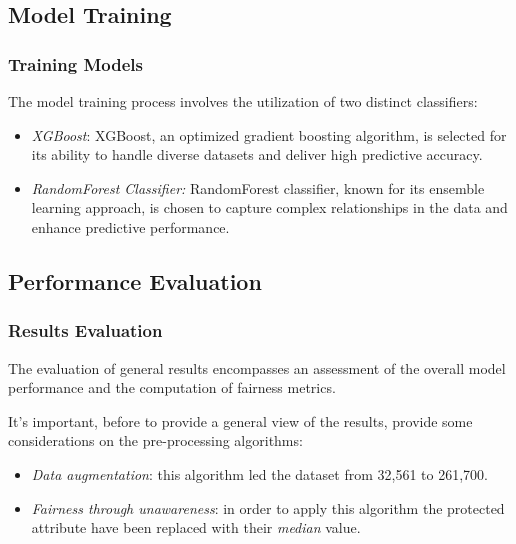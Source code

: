 \subsection{Model Training}

\subsubsection{Training Models}

The model training process involves the utilization of two distinct classifiers:

\begin{itemize}

    \item \emph{XGBoost}: XGBoost, an optimized gradient boosting algorithm, is selected for its ability to handle diverse datasets and deliver high predictive accuracy.

    \item \emph{RandomForest Classifier:} RandomForest classifier, known for its ensemble learning approach, is chosen to capture complex relationships in the data and enhance predictive performance.

\end{itemize}


\subsection{Performance Evaluation}

\subsubsection{Results Evaluation}

The evaluation of general results encompasses an assessment of the overall model performance and the computation of fairness metrics.

It's important, before to provide a general view of the results, provide some considerations on the pre-processing algorithms:

\begin{itemize}
    \item \emph{Data augmentation}: this algorithm led the dataset from 32,561 to 261,700.
    \item \emph{Fairness through unawareness}: in order to apply this algorithm the protected attribute have been replaced with their \emph{median} value.
\end{itemize}

